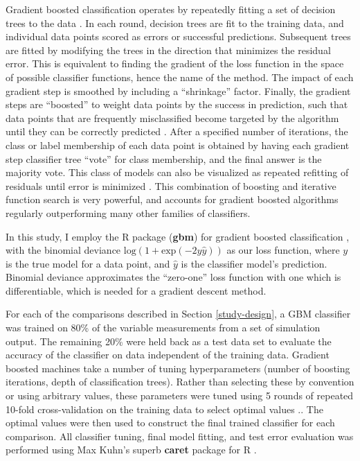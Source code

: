 \documentclass[10pt,letterpaper]{article}
\begin{document}
Gradient boosted classification operates by repeatedly fitting a set of
decision trees to the data \cite{AlexeyNatekin:2013ew,hastie2009elements}. In each round, decision trees are fit to the training data, and individual data points scored as errors or successful predictions.  Subsequent trees are fitted by modifying the trees in the direction that minimizes the residual error.  This is equivalent to finding the gradient of the loss function in the space of possible classifier functions, hence the name of the method.  The impact of each gradient step is smoothed by including a ``shrinkage'' factor.  Finally, the gradient steps are ``boosted'' to weight data points by the success in prediction, such that data points that are frequently misclassified become targeted by the algorithm until they can be correctly predicted \cite{freund1995boosting, freund1999short, schapire2012boosting}.  After a specified number of iterations, the class or label membership of each data point is obtained by having each gradient step classifier tree ``vote'' for class membership, and the final answer is the majority vote.  This class of models can also be visualized as repeated refitting of residuals until error is minimized \cite{friedman2001greedy}.  This combination of boosting and iterative function search is very powerful, and accounts for gradient boosted algorithms regularly outperforming many other families of classifiers.

In this study, I employ the R package (\textbf{gbm}) for gradient
boosted classification \cite{ridgeway1999state}, with the binomial deviance \(\textrm{log}(1 + \textrm{exp}(-2y\hat{y}))\) as our loss function, where \(y\) is the true
model for a data point, and \(\hat{y}\) is the classifier model's
prediction.  Binomial deviance approximates the ``zero-one'' loss function with one which is differentiable, which is needed for a gradient descent method.  

For each of the comparisons described in Section \ref{study-design}, a GBM classifier was trained on 80\% of the variable measurements from a set of simulation output.  The remaining 20\% were held back as a test data set to evaluate the accuracy of the classifier on data independent of the training data.  Gradient boosted machines take a number of tuning hyperparameters (number of boosting iterations, depth of classification trees).  Rather than selecting these by convention or using arbitrary values, these parameters were tuned using 5 rounds of repeated 10-fold cross-validation on the training data to select optimal values \cite{Kim:2009im, kuhn2013applied}..  The optimal values were then used to construct the final trained classifier for each comparison.  All classifier tuning,
final model fitting, and test error evaluation was performed using Max
Kuhn's superb \textbf{caret} package for R
\cite{kuhn2008building, kuhn2013applied}.
\end{document}
